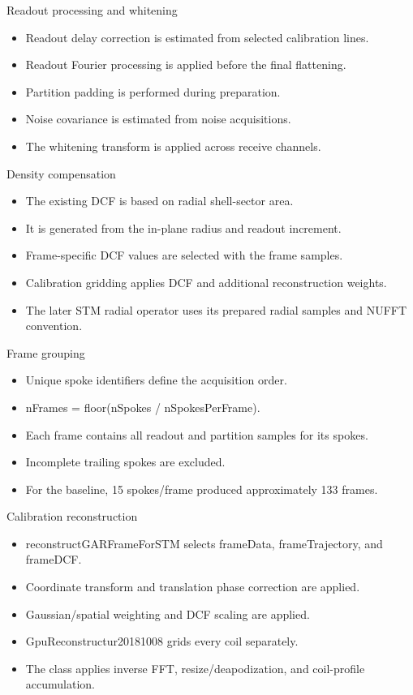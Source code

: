 \documentclass[aspectratio=169,professionalfonts]{beamer}
\begin{document}
\begin{frame}{Readout processing and whitening}
\begin{itemize}
\item Readout delay correction is estimated from selected calibration lines.
\item Readout Fourier processing is applied before the final flattening.
\item Partition padding is performed during preparation.
\item Noise covariance is estimated from noise acquisitions.
\item The whitening transform is applied across receive channels.
\end{itemize}
\end{frame}
\begin{frame}{Density compensation}
\begin{itemize}
\item The existing DCF is based on radial shell-sector area.
\item It is generated from the in-plane radius and readout increment.
\item Frame-specific DCF values are selected with the frame samples.
\item Calibration gridding applies DCF and additional reconstruction weights.
\item The later STM radial operator uses its prepared radial samples and NUFFT convention.
\end{itemize}
\end{frame}
\begin{frame}{Frame grouping}
\begin{itemize}
\item Unique spoke identifiers define the acquisition order.
\item nFrames = floor(nSpokes / nSpokesPerFrame).
\item Each frame contains all readout and partition samples for its spokes.
\item Incomplete trailing spokes are excluded.
\item For the baseline, 15 spokes/frame produced approximately 133 frames.
\end{itemize}
\end{frame}
\begin{frame}{Calibration reconstruction}
\begin{itemize}
\item reconstructGARFrameForSTM selects frameData, frameTrajectory, and frameDCF.
\item Coordinate transform and translation phase correction are applied.
\item Gaussian/spatial weighting and DCF scaling are applied.
\item GpuReconstructur20181008 grids every coil separately.
\item The class applies inverse FFT, resize/deapodization, and coil-profile accumulation.
\end{itemize}
\end{frame}
\end{document}
